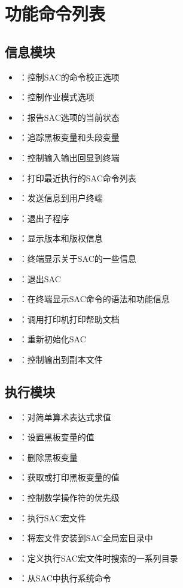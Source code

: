 \section*{功能命令列表}

\subsection*{信息模块}
\begin{itemize}
\item {}：控制SAC的命令校正选项
\item {}：控制作业模式选项
\item {}：报告SAC选项的当前状态
\item {}：追踪黑板变量和头段变量
\item {}：控制输入输出回显到终端
\item {}：打印最近执行的SAC命令列表
\item {}：发送信息到用户终端
\item {}：退出子程序
\item {}：显示版本和版权信息
\item {}：终端显示关于SAC的一些信息
\item {}：退出SAC
\item {}：在终端显示SAC命令的语法和功能信息
\item {}：调用打印机打印帮助文档
\item {}：重新初始化SAC
\item {}：控制输出到副本文件
\end{itemize}

\subsection*{执行模块}
\begin{itemize}
\item {}：对简单算术表达式求值
\item {}：设置黑板变量的值
\item {}：删除黑板变量
\item {}：获取或打印黑板变量的值
\item {}：控制数学操作符的优先级
\item {}：执行SAC宏文件
\item {}：将宏文件安装到SAC全局宏目录中
\item {}：定义执行SAC宏文件时搜索的一系列目录
\item {}：从SAC中执行系统命令
\end{itemize}

